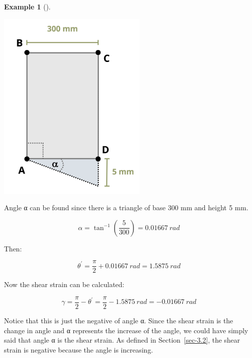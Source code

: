 \documentclass[
  letterpaper,
  DIV=11,
  numbers=noendperiod]{scrreprt}
\theoremstyle{definition}
\newtheorem{example}{Example}[chapter]
\theoremstyle{remark}
\begin{document}
\begin{tcolorbox}
\begin{example}[]
\begin{tcolorbox}
\begin{center}
\includegraphics[width=2.84375in,height=\textheight]{images/CH3 PNGs/example 3.3 part 2.png}
\end{center}

Angle α can be found since there is a triangle of base 300 mm and height
5 mm.

\[
\alpha=\tan ^{-1}\left(\frac{5}{300}\right)=0.01667 {~rad}
\]

Then:

\[
\theta^{\prime}=\frac{\pi}{2}+0.01667{~rad}=1.5875 {~rad}
\]

Now the shear strain can be calculated:

\[
\gamma=\frac{\pi}{2}-\theta^{\prime}=\frac{\pi}{2}-1.5875{~rad}=-0.01667 {~rad}
\]

Notice that this is just the negative of angle α. Since the shear strain
is the change in angle and α represents the increase of the angle, we
could have simply said that angle α is the shear strain. As defined in
Section~\ref{sec-3.2}, the shear strain is negative because the angle is
increasing.

\end{tcolorbox}

\end{example}

\end{tcolorbox}
\end{document}
